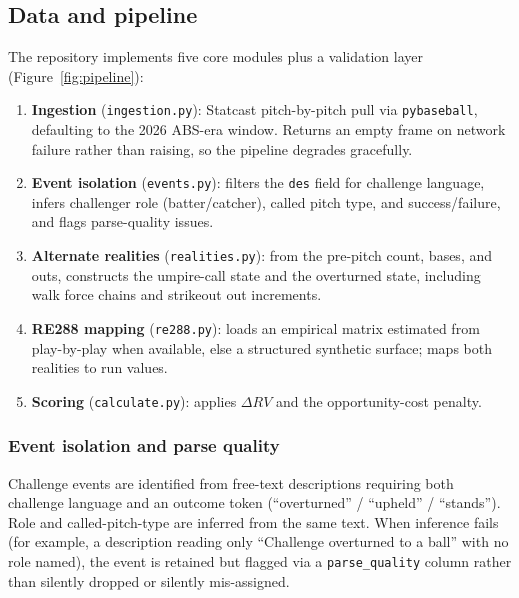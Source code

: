 \subsection{Data and pipeline}
\label{sec:pipeline}
The repository implements five core modules plus a validation layer
(Figure~\ref{fig:pipeline}):

\begin{enumerate}
  \item \textbf{Ingestion} (\texttt{ingestion.py}): Statcast pitch-by-pitch
        pull via \texttt{pybaseball}, defaulting to the 2026 ABS-era window.
        Returns an empty frame on network failure rather than raising, so the
        pipeline degrades gracefully.
  \item \textbf{Event isolation} (\texttt{events.py}): filters the
        \texttt{des} field for challenge language, infers challenger role
        (batter/catcher), called pitch type, and success/failure, and flags
        parse-quality issues.
  \item \textbf{Alternate realities} (\texttt{realities.py}): from the
        pre-pitch count, bases, and outs, constructs the umpire-call state
        and the overturned state, including walk force chains and
        strikeout out increments.
  \item \textbf{RE288 mapping} (\texttt{re288.py}): loads an empirical matrix
        estimated from play-by-play when available, else a structured
        synthetic surface; maps both realities to run values.
  \item \textbf{Scoring} (\texttt{calculate.py}): applies $\Delta RV$ and the
        opportunity-cost penalty.
\end{enumerate}


\subsubsection{Event isolation and parse quality}
Challenge events are identified from free-text descriptions requiring both
challenge language and an outcome token (``overturned'' / ``upheld'' /
``stands''). Role and called-pitch-type are inferred from the same text. When
inference fails (for example, a description reading only ``Challenge overturned
to a ball'' with no role named), the event is retained but flagged via a
\texttt{parse\_quality} column rather than silently dropped or silently
mis-assigned.

